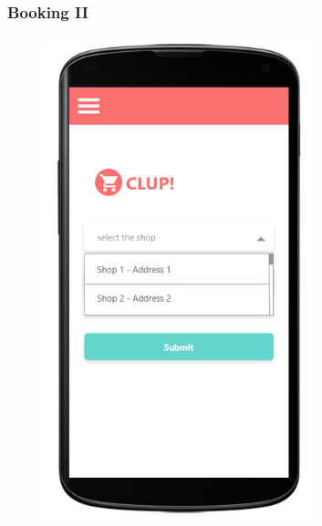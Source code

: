 \subsubsection{Booking II}
\begin{figure}[H]
  \centering
  \includegraphics[width=0.7\textwidth,keepaspectratio]{images/10.png}
\end{figure}


